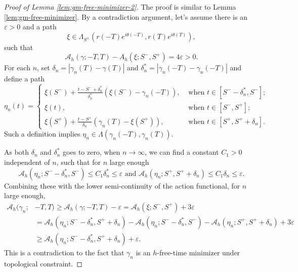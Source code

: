 \documentclass[11pt]{amsart}
\newcommand{\A}{\mathcal A}
\newcommand{\gm}{\gamma}
\newcommand{\ep}{\varepsilon}
\newcommand{\dl}{\delta}
\newcommand{\tht}{\theta}
\newcommand{\Lmd}{\Lambda}
\theoremstyle{plain}
\theoremstyle{definition}
\theoremstyle{remark}
\begin{document}
\begin{proof}[Proof of Lemma \ref{lem;gm-free-minimizer-2}]
The proof is similar to Lemma \ref{lem;gm-free-minimizer}. By a contradiction argument, let's assume there is an $\ep>0$ and a path 
$$ \xi \in \Lmd_{S^{\pm}}( r(-T) e^{i \tht(-T)}, r(T)e^{i \tht(T)}), $$
such that 
\begin{equation*}
\label{eq;4-ep}  \A_h(\gm; -T, T) - A_h(\xi; S^-, S^+) = 4 \ep  >0. 
\end{equation*}
For each $n$, set $\dl_n= |\gm_n(T) - \gm(T)|$ and $\dl_n^* = |\gm_n(-T) - \gm_n(-T)|$ and define a path
\begin{equation*}
\eta_n(t) = \begin{cases}
\xi(S^-) + \frac{t-S^- +\dl_n^*}{\dl_n^*} (\xi(S^-) - \gm_n(-T)), & \text{ when } t \in [S^- -\dl_n^*, S^-]; \\
\xi(t), & \text{ when } t \in [S^-, S^+]; \\
\xi(S^+) + \frac{t - S^+}{\dl_n} (\gm_n(T) -\xi(S^+)), & \text{ when } t \in [S^+, S^+ +\dl_n]. 
\end{cases}
\end{equation*}
Such a definition implies $\eta_n \in \Lmd(\gm_n(-T), \gm_n(T))$. 

As both $\dl_n$ and $\dl_n^*$ goes to zero, when $n \to \infty$, we can find a constant $C_1>0$ independent of $n$, such that for $n$ large enough
\begin{equation*}
\A_h(\eta_n; S^--\dl_n^*, S^-) \le C_1 \dl_n^* \le \ep \text{ and } \A_h(\eta_n; S^+, S^+ + \dl_n) \le C_1 \dl_n \le \ep. 
\end{equation*}
Combining these with the lower semi-continuity of the action functional, for $n$ large enough,
$$ \begin{aligned}
\A_h(\gm_n; & -T, T) \ge \A_h(\gm; -T, T) -\ep = \A_h(\xi; S^-, S^+) +3\ep \\
& = \A_h(\eta_n; S^- -\dl_n^*, S^+ +\dl_n) - \A_h(\eta_n;  S^- -\dl_n^*, S^-) - \A_h(\eta_n; S^+, S^+ +\dl_n) +3\ep \\
& \ge \A_h(\eta_n; S^- -\dl_n^*, S^+ +\dl_n) +\ep.
\end{aligned}
$$
This is a contradiction to the fact that $\gm_n$ is an $h$-free-time minimizer under topological constraint. 

\end{proof}
 



 



\end{document}
